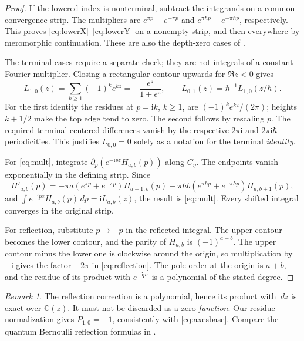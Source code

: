 \documentclass[11pt]{article}
\numberwithin{equation}{section}
\theoremstyle{definition}
\theoremstyle{remark}
\newtheorem{remark}[remark]{Remark}
\newcommand{\C}{\mathbb C}
\newcommand{\dd}{\,d}
\newcommand{\ii}{\mathrm i}
\newcommand{\qh}{\hbar}
\begin{document}
\begin{proof}
If the lowered index is nonterminal, subtract the integrands on a common
convergence strip. The multipliers are $e^{\pi p}-e^{-\pi p}$ and
$e^{\pi\qh p}-e^{-\pi\qh p}$, respectively. This proves
\eqref{eq:lowerX}--\eqref{eq:lowerY} on a nonempty strip, and then everywhere
by meromorphic continuation. These are also the depth-zero cases of
\cite[Section~3.0.1]{Goncharov2026}.

The terminal cases require a separate check; they are not integrals of a
constant Fourier multiplier. Closing a rectangular contour upwards for
$\Re z<0$ gives
\begin{equation}\label{eq:axesbase}
 L_{1,0}(z)=\sum_{k\geq1}(-1)^ke^{kz}
          =-\frac{e^z}{1+e^z},\qquad
 L_{0,1}(z)=\qh^{-1}L_{1,0}(z/\qh).
\end{equation}
For the first identity the residues at $p=\ii k$, $k\geq1$, are
$(-1)^ke^{kz}/(2\pi)$; heights $k+1/2$ make the top edge tend to zero.
The second follows by rescaling $p$. The required terminal centered
differences vanish by the respective $2\pi\ii$ and $2\pi\ii\qh$
periodicities. This justifies $L_{0,0}=0$ solely as a notation for the terminal
\emph{identity}.

For \eqref{eq:mult}, integrate
$\partial_p(e^{-\ii pz}H_{a,b}(p))$ along $C_\eta$.
The endpoints vanish exponentially in the defining strip. Since
\[
 H'_{a,b}(p)=-\pi a(e^{\pi p}+e^{-\pi p})H_{a+1,b}(p)
             -\pi\qh b(e^{\pi\qh p}+e^{-\pi\qh p})H_{a,b+1}(p),
\]
and $\int e^{-\ii pz}H_{a,b}(p)\dd p=\ii L_{a,b}(z)$, the result is
\eqref{eq:mult}. Every shifted integral converges in the original strip.

For reflection, substitute $p\mapsto-p$ in the reflected integral. The
upper contour becomes the lower contour, and the parity of $H_{a,b}$ is
$(-1)^{a+b}$. The upper contour minus the lower one is clockwise around the
origin, so multiplication by $-\ii$ gives the factor $-2\pi$ in
\eqref{eq:reflection}. The pole order at the origin is $a+b$, and the residue
of its product with $e^{-\ii pz}$ is a polynomial of the stated degree.
\end{proof}

\begin{remark}
The reflection correction is a polynomial, hence its product with $\dd z$
is exact over $\C(z)$. It must not be discarded as a zero \emph{function}.
Our residue normalization gives $P_{1,0}=-1$, consistently with
\eqref{eq:axesbase}. Compare the quantum Bernoulli reflection formulas in
\cite[Section~5]{Goncharov2026}.
\end{remark}
\end{document}
